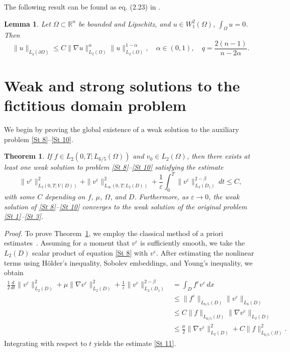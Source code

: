 \documentclass[11pt]{article}
\newtheorem{lemma}{Lemma}
\newtheorem{theorem}{Theorem}
\begin{document}
The following result can be found as eq. (2.23) in \cite{antontsev1989boundary}.
\begin{lemma}\label{Lem4}
	Let ${\Omega}\subset\mathbb{R}^n$ be bounded {and Lipschitz}, and $u \in W^2_1(\Omega)$, $\int_\Omega u =0$. Then
	\[
	\|u\|_{L_q(\partial\Omega)} \leq C \|\nabla u\|_{L_2(\Omega)}^{\alpha} \|u\|_{L_2(\Omega)}^{1-\alpha}, \quad \alpha\in (0,1), \quad q=\frac{2(n-1)}{n-2\alpha}.
	\]
\end{lemma} 


\section{Weak and strong solutions to the fictitious domain problem}\label{S3}

We begin by proving the global existence of a weak solution to the auxiliary problem \eqref{St 8}--\eqref{St 10}.

\begin{theorem}\label{Th1}
	If \( f \in L_2(0,T;L_{6/5}(\Omega)) \) and \( v_0 \in L_2(\Omega) \), then there exists at least one weak solution to problem \textnormal{\eqref{St 8}--\eqref{St 10}} satisfying the estimate
	\begin{equation} \label{St 11}
		\|v^{\varepsilon}\|^2_{L_2(0,T;V(D))} + \|v^{\varepsilon}\|^2_{L_\infty(0,T;L_2(D))} 
		+ \frac{1}{\varepsilon} \int_0^T \|v^{\varepsilon}\|_{L_2(D_1)}^{2 - \beta} \, dt \leq C,
	\end{equation}
	{with some $C$ depending on $f$, $\mu$, $\Omega$, and $D$. }
	Furthermore, as $\varepsilon \to 0$, the weak solution of \eqref{St 8}--\eqref{St 10} converges to the weak solution of the original problem \eqref{St 1}--\eqref{St 3}.
\end{theorem}

\noindent
\textit{Proof.} To prove Theorem~\ref{Th1}, we employ the classical method of a priori estimates~\cite[{section~III.1}]{antontsev1989boundary}.  
Assuming for a moment that $v^{\varepsilon}$ is sufficiently smooth, we take the $L_2(D)$ scalar product of equation \eqref{St 8} with $v^{\varepsilon}$.  
After estimating the nonlinear terms using Hölder’s inequality, Sobolev embeddings, and Young’s inequality, we obtain
\begin{align*}
	\frac{1}{2}\frac{d}{dt}\|v^{\varepsilon}\|^{2}_{L_2(D)} 
	+ \mu\|\nabla v^{\varepsilon}\|^{2}_{L_2 (D)} 
	+ \frac{1}{\varepsilon} \|v^{\varepsilon}\|^{2-\beta}_{L_2 (D_1)} 
	&= \int_D f^{\varepsilon} v^{\varepsilon} \, dx  \\
	&\leq \|f^{\varepsilon}\|_{L_{6/5}(D)} \|v^{\varepsilon}\|_{L_6 (D)} \\
	&\leq C\|f\|_{L_{6/5}(\Omega)} \|\nabla v^{\varepsilon}\|_{L_2 (D)} \\
	&\leq \frac{\mu}{2} \|\nabla v^{\varepsilon}\|^{2}_{L_2 (D)} + C\|f\|^{2}_{L_{6/5} (\Omega)}.
\end{align*}
Integrating with respect to $t$ yields the estimate \eqref{St 11}.
\end{document}
